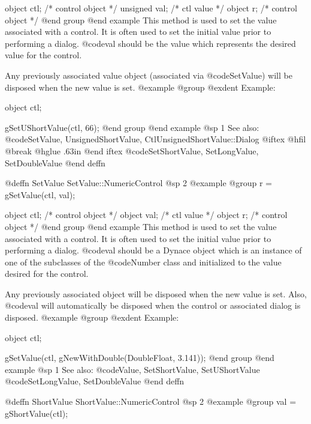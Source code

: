 object    ctl;  /*  control object  */
unsigned  val;  /*  ctl value       */
object    r;    /*  control object  */
@end group
@end example
This method is used to set the value associated with a control.  It is
often used to set the initial value prior to performing a dialog.
@code{val} should be the value which represents the desired value for
the control.

Any previously associated value object (associated via @code{SetValue})
will be disposed when the new value is set.
@example
@group
@exdent Example:

object  ctl;

gSetUShortValue(ctl, 66);
@end group
@end example
@sp 1
See also:  @code{SetValue, UnsignedShortValue, CtlUnsignedShortValue::Dialog}
@iftex
@hfil @break @hglue .63in 
@end iftex
@code{SetShortValue, SetLongValue, SetDoubleValue}
@end deffn
















@deffn {SetValue} SetValue::NumericControl
@sp 2
@example
@group
r = gSetValue(ctl, val);

object  ctl;    /*  control object  */
object  val;    /*  ctl value       */
object  r;      /*  control object  */
@end group
@end example
This method is used to set the value associated with a control.  It is
often used to set the initial value prior to performing a dialog.
@code{val} should be a Dynace object which is an instance of one of the
subclasses of the @code{Number} class and initialized to the value
desired for the control.

Any previously associated object will be disposed when the new value is set.
Also, @code{val} will automatically be disposed when the control or associated
dialog is disposed.
@example
@group
@exdent Example:

object  ctl;

gSetValue(ctl, gNewWithDouble(DoubleFloat, 3.141));
@end group
@end example
@sp 1
See also:  @code{Value, SetShortValue, SetUShortValue}
        @code{SetLongValue, SetDoubleValue}
@end deffn











@deffn {ShortValue} ShortValue::NumericControl
@sp 2
@example
@group
val = gShortValue(ctl);

